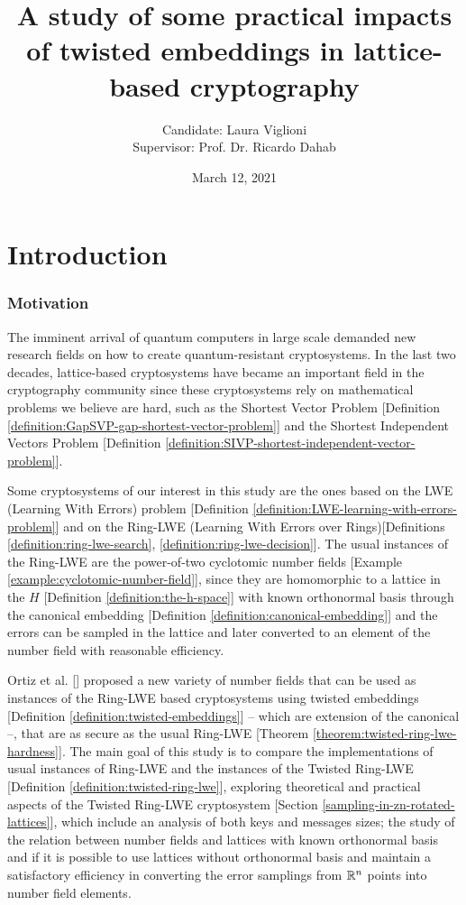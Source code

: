 \documentclass[a4paper,12pt]{article}
\author{Candidate: Laura Viglioni \\ Supervisor: Prof. Dr. Ricardo Dahab}
\date{March 12, 2021}
\title{A study of some practical impacts of twisted embeddings in lattice-based cryptography}
\begin{document}
\maketitle

\section{Introduction}
\label{sec:orgc6a0dee}
\subsubsection*{Motivation}
\label{sec:org8fc1e51}
The imminent arrival of quantum computers in large scale demanded new research fields on how to create quantum-resistant cryptosystems. In the last two decades, lattice-based cryptosystems have became an important field in the cryptography community since these cryptosystems rely on mathematical problems we believe are hard, such as the Shortest Vector Problem [Definition \ref{definition:GapSVP-gap-shortest-vector-problem}] and the Shortest Independent Vectors Problem [Definition \ref{definition:SIVP-shortest-independent-vector-problem}].

Some cryptosystems of our interest in this study are the ones based on the LWE (Learning With Errors) problem [Definition \ref{definition:LWE-learning-with-errors-problem}] and on the Ring-LWE (Learning With Errors over Rings)[Definitions \ref{definition:ring-lwe-search}, \ref{definition:ring-lwe-decision}]. The usual instances of the Ring-LWE are the power-of-two cyclotomic number fields [Example \ref{example:cyclotomic-number-field}], since they are homomorphic to a lattice in the \(H\) [Definition \ref{definition:the-h-space}]  with known orthonormal basis through the canonical embedding [Definition \ref{definition:canonical-embedding}] and the errors can be sampled in the lattice and later converted to an element of the number field with reasonable efficiency.

Ortiz et al. [\cite{Ortiz2021}] proposed a new variety of number fields that can be used as instances of the Ring-LWE based cryptosystems using twisted embeddings [Definition \ref{definition:twisted-embeddings}] -- which are extension of the canonical --, that are as secure as the usual Ring-LWE [Theorem \ref{theorem:twisted-ring-lwe-hardness}]. The main goal of this study is to compare the implementations of usual instances of Ring-LWE and the instances of the Twisted Ring-LWE [Definition \ref{definition:twisted-ring-lwe}], exploring theoretical and practical aspects of the Twisted Ring-LWE cryptosystem [Section \ref{sampling-in-zn-rotated-lattices}], which include an analysis of both keys and messages sizes; the study of the relation between number fields and lattices with known orthonormal basis and if it is possible to use lattices without orthonormal basis and maintain a satisfactory efficiency in converting the error samplings from \(\mathbb{R}^n\) points into number field elements.
\end{document}
